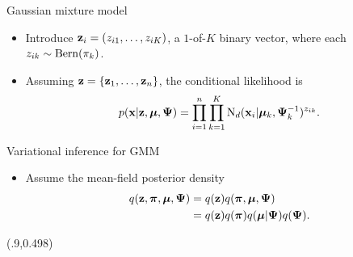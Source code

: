 \begin{frame}{Gaussian mixture model}
  \vspace{-2.5mm}
  \begin{itemize}
    \item Introduce ${\mathbf z}_i = (z_{i1},\dots,z_{iK})$, a $1$-of-$K$ binary vector, where each $z_{ik} \sim \operatorname{Bern}(\pi_k)$.
    \item Assuming ${\mathbf z} = \{{\mathbf z}_1,\dots,{\mathbf z}_n \}$, the conditional likelihood is
    \[
      p({\mathbf x}|{\mathbf z},{\bm\mu},{\bm\Psi}) = \prod_{i=1}^n \prod_{k=1}^K \operatorname{N}_d({\mathbf x}_i|{\bm\mu}_k,{\bm\Psi}_k^{-1})^{z_{ik}}.
    \]
  \end{itemize}
\end{frame}

\begin{frame}[label=vigmm]{Variational inference for GMM}
  \begin{itemize}
    \item Assume the mean-field posterior density
    \begin{align*}
      q({\mathbf z},{\bm\pi},{\bm\mu},{\bm\Psi}) &= q({\mathbf z})q({\bm\pi},{\bm\mu},{\bm\Psi}) \\
      &= q({\mathbf z})q({\bm\pi})q({\bm\mu}|{\bm\Psi})q({\bm\Psi}).
    \end{align*}
  \end{itemize}
  
  \begin{center}
  \end{center}
  
  \begin{textblock*}{3cm}(.9\textwidth,0.498\textheight)%
    \hyperlink{vigmmsoln}{}      
  \end{textblock*}
\end{frame}

